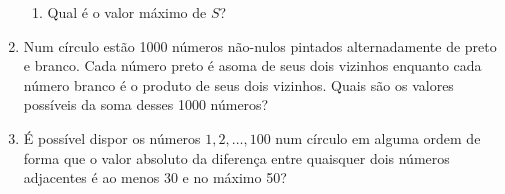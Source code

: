 \documentclass{article}
\begin{document}
\begin{enumerate}
\begin{enumerate}
    \item Qual é o valor máximo de $S$?
    \end{enumerate}
    
    \item Num círculo estão 1000 números não-nulos pintados alternadamente de preto e branco.
    Cada número preto é asoma de seus dois vizinhos
    enquanto cada número branco é o produto de seus dois vizinhos.
    Quais são os valores possíveis da soma desses 1000 números?
    
    \item É possível dispor os números $1,2,\dots,100$ num círculo em alguma ordem
    de forma que o valor absoluto da diferença entre quaisquer dois números adjacentes é ao menos 30 e no máximo 50?
\end{enumerate}
\end{document}
